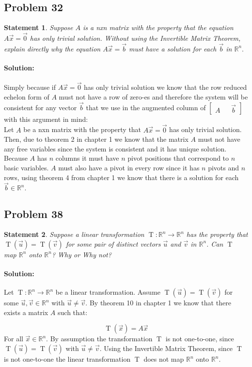 \documentclass[12pt, letterpaper]{article}
\newcommand{\R}{\mathbb{R}}
\theoremstyle{statement}
\theoremstyle{statement}
\newtheorem*{atmStat}{Statement}
\newenvironment{Solution}{\noindent\ignorespaces\paragraph{Solution:}}{\hfill \ding{122}\par\noindent}
\newcommand{\func}[2]{\operatorname{#1}(#2)}
\newcommand{\trans}[2]{\func{#1}{\Vec{#2}}}
\begin{document}
    \subsection*{Problem 32}
    \begin{atmStat}
    Suppose $A$ is a nxn matrix with the property that the equation $A\Vec{x}=\Vec{0}$ has only trivial solution. Without using the Invertible Matrix Theorem, explain directly why the equation $A\Vec{x}=\Vec{b}$ must have a solution for each $\Vec{b}$ in $\R^n.$
    \end{atmStat}
    \begin{Solution}
    Simply because if $A\Vec{x}=\Vec{0}$ has only trivial solution we know that the row reduced echelon form of $A$ must not have a row of zero-es and therefore the system will be consistent for any vector $\Vec{b}$ that we use in the augmented column of $\begin{bmatrix} A && \Vec{b}\end{bmatrix}$ with this argument in mind:\\
    
    Let $A$ be a nxn matrix with the property that $A\Vec{x}=\Vec{0}$ has only trivial solution. Then, due to theorem 2 in chapter 1 we know that the matrix $A$ must not have any free variables since the system is consistent and it has unique solution. Because $A$ has $n$ columns it must have $n$ pivot positions that correspond to $n$ basic variables. $A$ must also have a pivot in every row since it has $n$ pivots and $n$ rows, using theorem 4 from chapter 1 we know that there is a solution for each $\Vec{b}\in\R^n$.
    \end{Solution}
    
    \subsection*{Problem 38}
    \begin{atmStat}
    Suppose a linear transformation $\operatorname{T}:\R^n\longrightarrow\R^n$ has the property that $\trans{T}{u}=\func{T}{\Vec{v}}$ for some pair of distinct vectors $\Vec{u}$ and $\Vec{v}$ in $\R^n$. Can $\operatorname{T}$ map $\R^n$ onto $\R^n$? Why or Why not?
    \end{atmStat}
    \begin{Solution}
    Let $\operatorname{T}:\R^n\longrightarrow\R^n$ be a linear transformation. Assume $\trans{T}{u}=\trans{T}{v}$ for some $\Vec{u},\Vec{v}\in\R^n$ with $\Vec{u}\neq\Vec{v}$. By theorem 10 in chapter 1 we know that there exists a matrix $A$ such that: 
    
    $$\trans{T}{x}=A\Vec{x}$$
    For all $\Vec{x}\in\R^n$. By assumption the transformation $\operatorname{T}$ is not one-to-one, since $\trans{T}{u}=\trans{T}{v}$ with $\Vec{u}\neq\Vec{v}$. Using the Invertible Matrix Theorem, since $\operatorname{T}$ is not one-to-one the linear transformation $\operatorname{T}$ does not map $\R^n$ onto $\R^n$.
    \end{Solution}
    
\end{document}
